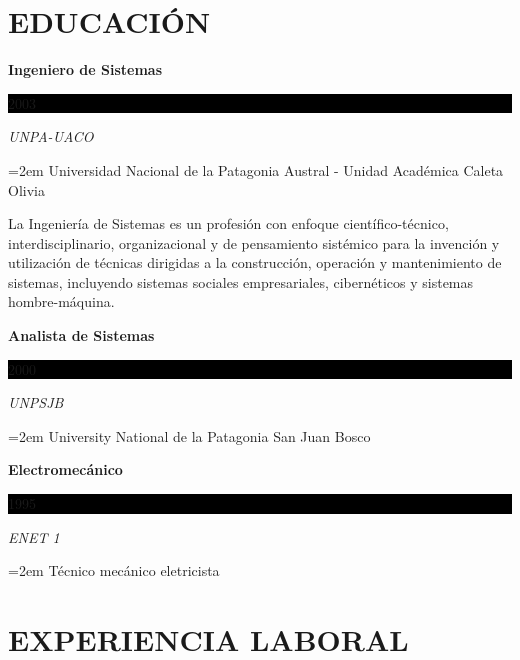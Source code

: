 \documentclass[paper=a4,fontsize=11pt]{scrartcl} %
\newcommand{\sepspace}{\vspace*{1em}}		%
\newcommand{\NewPart}[1]{\section*{\uppercase{#1}}}
\newcommand{\EducationEntry}[4]{
		\noindent \textbf{#1} \hfill      %
		\colorbox{Black}{%
			\parbox{6em}{%
			\hfill\color{White}#2}} \par  %
		\noindent \textit{#3} \par        %
		\noindent\hangindent=2em\hangafter=0 \small #4 %
		\normalsize \par}
\begin{document}
\sepspace

\NewPart{Educación}{}

\EducationEntry{Ingeniero de Sistemas}{2003}{UNPA-UACO}
{Universidad Nacional de la Patagonia Austral - Unidad Académica Caleta Olivia}
La Ingeniería de Sistemas es un profesión con enfoque científico-técnico, interdisciplinario, organizacional y de pensamiento sistémico para la invención y utilización de técnicas dirigidas a la construcción, operación y mantenimiento de sistemas, incluyendo sistemas sociales empresariales, cibernéticos y sistemas hombre-máquina.
\sepspace

\EducationEntry{Analista de Sistemas}{2000}{UNPSJB}
{University National de la Patagonia San Juan Bosco}
\sepspace

\EducationEntry{Electromecánico}{1995}{ENET 1}
{Técnico mecánico eletricista}
\sepspace

\NewPart{Experiencia laboral}{}
\end{document}
